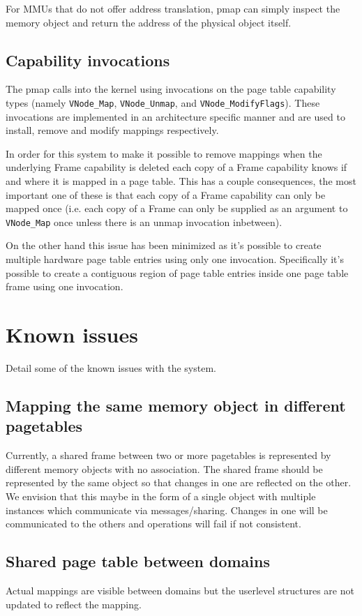 \documentclass[a4paper,twoside]{report} %
\begin{document}
For MMUs that do not offer address translation,
pmap can simply inspect the memory object and return the address of the physical object itself.

\section{Capability invocations}

The pmap calls into the kernel using invocations on the page table capability
types (namely \verb|VNode_Map|, \verb|VNode_Unmap|, and
\verb|VNode_ModifyFlags|).  These invocations are implemented in an
architecture specific manner and are used to install, remove and modify
mappings respectively.

In order for this system to make it possible to remove mappings when the
underlying Frame capability is deleted each copy of a Frame capability knows
if and where it is mapped in a page table.  This has a couple consequences,
the most important one of these is that each copy of a Frame capability can
only be mapped once (i.e. each copy of a Frame can only be supplied as an
argument to \verb|VNode_Map| once unless there is an unmap invocation
inbetween).

On the other hand this issue has been minimized as it's possible to create
multiple hardware page table entries using only one invocation.  Specifically
it's possible to create a contiguous region of page table entries inside one
page table frame using one invocation.

\chapter{Known issues}
Detail some of the known issues with the system.

\section{Mapping the same memory object in different pagetables}
Currently, a shared frame between two or more pagetables is
represented by different memory objects with no association.
The shared frame should be represented by the same object so that changes in one are reflected on the other.
We envision that this maybe in the form of a single object
with multiple instances which communicate via messages/sharing.
Changes in one will be communicated to the others and operations will fail if not consistent.

\section{Shared page table between domains}
Actual mappings are visible between domains
but the userlevel structures are not updated to reflect the mapping.
\end{document}
